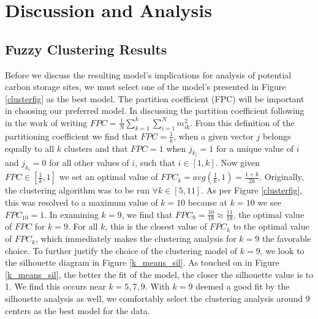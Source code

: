 \documentclass[letterpaper, 12pt]{article}
\begin{document}
\section{Discussion and Analysis}\label{danda}
\subsection{Fuzzy Clustering Results}\label{fcmr}
Before we discuss the resulting model's implications for analysis of potential carbon storage sites, we must select one of the model's presented in Figure \ref{clusterfig} as the best model. 
The partition coefficient (FPC) will be important in choosing our preferred model. In discussing the partition coefficient following in the work of \cite{dunnbar} writing $FPC = \frac{1}{N}\sum_{k = 1}^k \sum_{i = 1}^N m_{ik}^2$. From this definition of the partitioning coefficient we find that $FPC = \frac{1}{k}$, when a given vector $j$ belongs equally to all $k$ clusters and that $FPC = 1$ when $j_{k_i} = 1$ for a unique value of $i$ and $j_{k_i} = 0$ for all other values of $i$, such that $i \in [1, k]$. Now given $FPC \in [\frac{1}{k}, 1]$ we set an optimal value of $FPC_k = avg(\frac{1}{k}, 1) =  \frac{1+k}{2k}$. 
Originally, the clustering algorithm was to be run $\forall k \in [5,11]$. As per Figure \ref{clusterfig}, this was resolved to a maximum value of $k = 10$ because at $k = 10$ we see $FPC_{10} = 1$. In examining $k = 9$, we find that $FPC_9 = \frac{10}{18} \approx \frac{11}{18}$, the optimal value of $FPC$ for $k = 9$. For all $k$, this is the closest value of $FPC_k$ to the optimal value of $FPC_k$, which immediately makes the clustering analysis for $k = 9$ the favorable choice. To further justify the choice of the clustering model of $k = 9$, we look to the silhouette diagram in Figure \ref{k_means_sil}. As touched on in Figure \ref{k_means_sil}, the better the fit of the model, the closer the silhouette value is to 1. We find this occurs near $k = 5, 7, 9$. With $k = 9$ deemed a good fit by the silhouette analysis as well, we comfortably select the clustering analysis around 9 centers as the best model for the data. 
\end{document}
